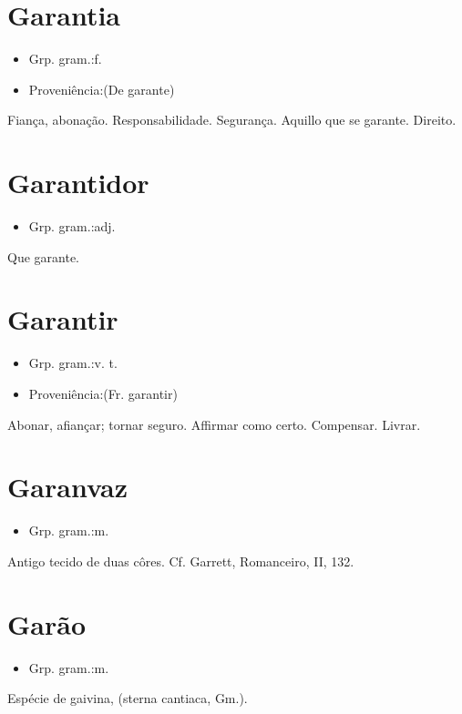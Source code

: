 \section{Garantia}
\begin{itemize}
\item {Grp. gram.:f.}
\end{itemize}
\begin{itemize}
\item {Proveniência:(De \textunderscore garante\textunderscore )}
\end{itemize}
Fiança, abonação.
Responsabilidade.
Segurança.
Aquillo que se garante.
Direito.
\section{Garantidor}
\begin{itemize}
\item {Grp. gram.:adj.}
\end{itemize}
Que garante.
\section{Garantir}
\begin{itemize}
\item {Grp. gram.:v. t.}
\end{itemize}
\begin{itemize}
\item {Proveniência:(Fr. \textunderscore garantir\textunderscore )}
\end{itemize}
Abonar, afiançar; tornar seguro.
Affirmar como certo.
Compensar.
Livrar.
\section{Garanvaz}
\begin{itemize}
\item {Grp. gram.:m.}
\end{itemize}
Antigo tecido de duas côres. Cf. Garrett, \textunderscore Romanceiro\textunderscore , II, 132.
\section{Garão}
\begin{itemize}
\item {Grp. gram.:m.}
\end{itemize}
Espécie de gaivina, (\textunderscore sterna cantiaca\textunderscore , Gm.).
